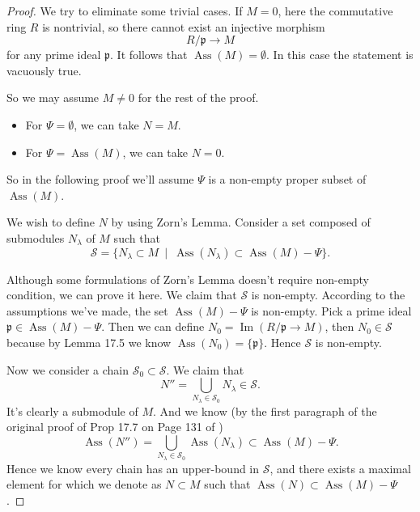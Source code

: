 \begin{proof}
    We try to eliminate some trivial cases. If $M=0$, here the commutative ring $R$ is nontrivial, so there cannot exist an injective morphism 
    \[R/\mathfrak p\to M\] for any prime ideal $\mathfrak p$. It follows that $\operatorname{Ass}(M)=\emptyset$. In this case the statement is vacuously true.

    So we may assume $M\neq 0$ for the rest of the proof. \begin{itemize}
        \item For $\Psi=\emptyset$, we can take $N=M$.
        \item For $\Psi=\operatorname{Ass}(M)$, we can take $N=0$.
    \end{itemize}
    So in the following proof we'll assume $\Psi$ is a non-empty proper subset of $\operatorname{Ass}(M)$.

    We wish to define $N$ by using Zorn's Lemma.
    Consider a set composed of submodules $N_{\lambda}$ of $M$ such that
    \[\mathcal S=\{N_{\lambda}\subset M ~\mid~ \operatorname{Ass}(N_{\lambda})\subset \operatorname{Ass}(M)-\Psi\}.\]

    Although some formulations of Zorn's Lemma doesn't require non-empty condition, we can prove it here. We claim that $\mathcal S$ is non-empty. According to the assumptions we've made, the set $\operatorname{Ass}(M)-\Psi$ is non-empty. Pick a prime ideal $\mathfrak p\in \operatorname{Ass}(M)-\Psi$. Then we can define $N_0=\operatorname{Im}(R/\mathfrak p\to M)$, then $N_0\in\mathcal S$ because by Lemma 17.5 we know $\operatorname{Ass}(N_0)=\{\mathfrak p\}$. Hence $\mathcal S$ is non-empty.

    Now we consider a chain $\mathcal S_0\subset \mathcal S$. We claim that  
    \[N''=\bigcup_{N_{\lambda}\in \mathcal S_0} N_{\lambda}\in \mathcal S.\] 
    It's clearly a submodule of $M$. And we know (by the first paragraph of the original proof of Prop 17.7 on Page 131 of \cite{altman})
    \[\operatorname{Ass}(N'')=\bigcup_{N_{\lambda}\in\mathcal S_0}\operatorname{Ass}(N_{\lambda})\subset \operatorname{Ass}(M)-\Psi.\]Hence we know every chain has an upper-bound in $\mathcal S$, and there exists a maximal element for which we denote as $N\subset M$ such that $\operatorname{Ass}(N)\subset \operatorname{Ass}(M)-\Psi$.


\end{proof}

